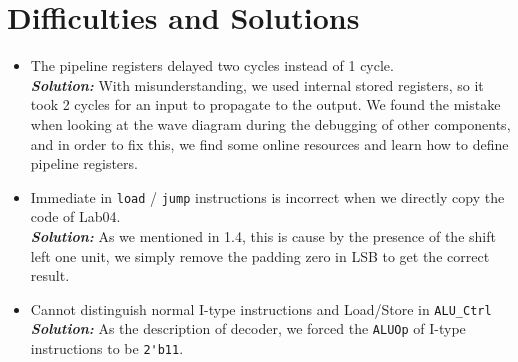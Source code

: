 \documentclass{article}
\begin{document}
\section{Difficulties and Solutions}
\begin{itemize}
    \item The pipeline registers delayed two cycles instead of 1 cycle. \\
    \textbf{\textit{Solution:}} With misunderstanding, we used internal stored registers, 
        so it took 2 cycles for an input to propagate to the output.
        We found the mistake when looking at the wave diagram during the debugging of other components,
        and in order to fix this, we find some online resources and learn how to define pipeline registers.
    \item Immediate in \verb|load| / \verb|jump| instructions is incorrect when we directly copy the code of Lab04. \\
    \textbf{\textit{Solution:}} As we mentioned in 1.4, this is cause by the presence of the shift left one unit, 
        we simply remove the padding zero in LSB to get the correct result.
    \item Cannot distinguish normal I-type instructions and Load/Store in \verb|ALU_Ctrl| \\
    \textbf{\textit{Solution:}} As the description of decoder, we forced the \verb|ALUOp| of I-type instructions to be \verb|2'b11|. 
\end{itemize}
\end{document}
